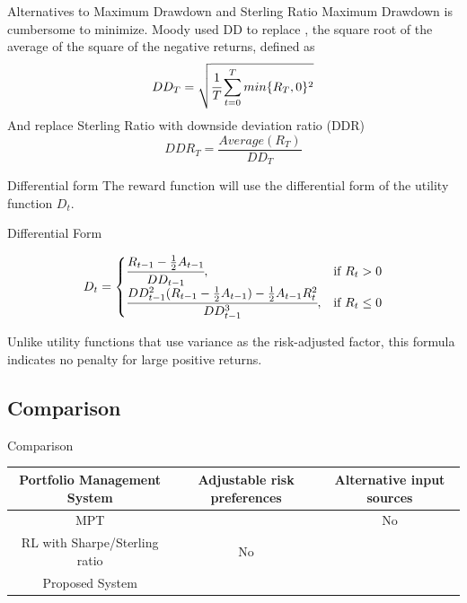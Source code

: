 \begin{frame}{Alternatives to Maximum Drawdown and  Sterling Ratio}
Maximum Drawdown is cumbersome to minimize.
Moody used DD to replace , the square root of the average of the
square of the negative returns, defined as
\[
DD_T = \sqrt{\cfrac{1}{T}\sum_{t=0}^{T}{min\{R_T,0\}^2}}
\]
And replace Sterling Ratio with downside deviation ratio (DDR)
\[
DDR_T = \frac{Average(R_T)}{DD_T}
\]
\end{frame}


\begin{frame}{Differential form}
The reward function will use the differential form of the utility function \(D_t\).

\begin{block}{Differential Form}

\[
D_t = 
\begin{cases}
    \cfrac{R_{t-1} -\frac{1}{2}A_{t-1}}{DD_{t-1}},&\text{if  }R_t > 0\\
    \cfrac{DD_{t-1}^2 (R_{t-1}-\frac{1}{2}A_{t-1})  -\frac{1}{2}A_{t-1} R_t^2}{DD_{t-1}^3},&\text{if  }R_t \leq 0
\end{cases}
\]
\end{block}
Unlike utility functions that use variance as the risk-adjusted factor, this formula indicates no penalty for large positive returns. 

\end{frame}


\subsection{Comparison}
\begin{frame}{Comparison}
    \centering
    \begin{tabular}{|| c|c|c|| }
    \hline \hline
    Portfolio Management System & Adjustable risk preferences & Alternative input sources \\     \hline \hline
    MPT & \color{blue}{Yes} & No \\  \hline
    RL with Sharpe/Sterling ratio& No & \color{blue}{Yes}  \\  \hline
    Proposed System & \color{blue}{Yes} & \color{blue}{Yes} \\   \hline \hline
    \end{tabular}

\end{frame}